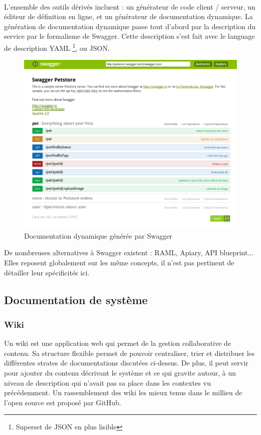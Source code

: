         \paragraph{}
            L'ensemble des outils dérivés incluent : un générateur de code client / serveur, un éditeur
            de définition en ligne, et un générateur de documentation dynamique.
            La génération de documentation dynamique passe tout d'abord par la description du service
            par le formalisme de Swagger. Cette description s'est fait avec le language de description YAML
            \footnote{Superset de JSON en plus lisible}, ou JSON.

        \begin{figure}[ht]
            \centering
            \includegraphics[scale=0.4]{./assets/swagger.png}
            \caption{Documentation dynamique générée par Swagger}
        \end{figure}

    De nombreuses alternatives à Swagger existent : RAML, Apiary, API blueprint... Elles reposent
    globalement sur les même concepts, il n'est pas pertinent de détailler leur spécificités ici.

\newpage
\subsection{Documentation de système}
    \subsubsection{Wiki}
        Un wiki est une application web qui permet de la gestion collaborative de contenu.
        Sa structure flexible permet de pouvoir centraliser, trier et distribuer les différentes strates
        de documentations discutées ci-dessus. De plus, il peut servir pour ajouter du contenu décrivant
        le système et ce qui gravite autour, à un niveau de description qui n'avait pas sa place dans les
        contextes vu précédemment. Un rassemblement des wiki les mieux tenus dans le millieu de l'open source
        est proposé par GitHub\cite{wiki}.


